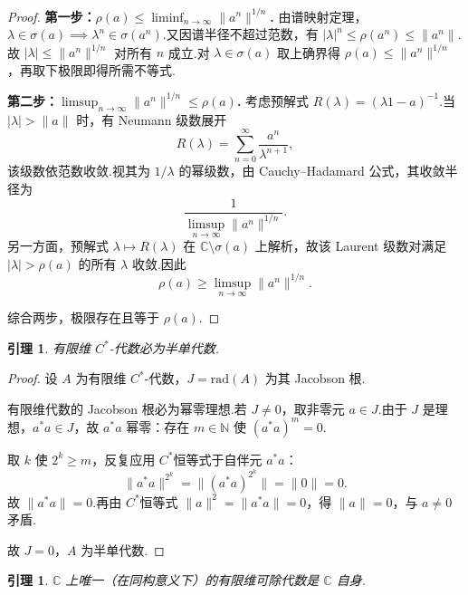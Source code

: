 \documentclass{ctexart}
\newtheorem{lemma}[theorem]{引理}
\theoremstyle{plain}
\newtheorem*{proof}{证明}
\theoremstyle{plain}
\begin{document}
\begin{proof}
    \textbf{第一步：$\rho(a) \le \liminf_{n \to \infty} \|a^n\|^{1/n}$.}
    由谱映射定理，$\lambda \in \sigma(a) \implies \lambda^n \in \sigma(a^n)$.又因谱半径不超过范数，有 $|\lambda|^n \le \rho(a^n) \le \|a^n\|$.故 $|\lambda| \le \|a^n\|^{1/n}$ 对所有 $n$ 成立.对 $\lambda \in \sigma(a)$ 取上确界得 $\rho(a) \le \|a^n\|^{1/n}$，再取下极限即得所需不等式.

    \textbf{第二步：$\limsup_{n \to \infty} \|a^n\|^{1/n} \le \rho(a)$.}
    考虑预解式 $R(\lambda) = (\lambda 1 - a)^{-1}$.当 $|\lambda| > \|a\|$ 时，有 Neumann 级数展开
    \begin{equation*}
        R(\lambda) = \sum_{n=0}^{\infty} \frac{a^n}{\lambda^{n+1}},
    \end{equation*}
    该级数依范数收敛.视其为 $1/\lambda$ 的幂级数，由 Cauchy--Hadamard 公式，其收敛半径为
    \begin{equation*}
        \frac{1}{\limsup_{n \to \infty} \|a^n\|^{1/n}}.
    \end{equation*}
    另一方面，预解式 $\lambda \mapsto R(\lambda)$ 在 $\mathbb{C} \setminus \sigma(a)$ 上解析，故该 Laurent 级数对满足 $|\lambda| > \rho(a)$ 的所有 $\lambda$ 收敛.因此
    \begin{equation*}
        \rho(a) \ge \limsup_{n \to \infty} \|a^n\|^{1/n}.
    \end{equation*}

    综合两步，极限存在且等于 $\rho(a)$.
\end{proof}


\begin{lemma}\label{lem:semisimple}
    有限维 $C^*$-代数必为半单代数.
\end{lemma}
\begin{proof}
    设 $A$ 为有限维 $C^*$-代数，$J = \mathrm{rad}(A)$ 为其 Jacobson 根.\par
    有限维代数的 Jacobson 根必为幂零理想.若 $J \neq 0$，取非零元 $a \in J$.由于 $J$ 是理想，$a^*a \in J$，故 $a^*a$ 幂零：存在 $m \in \mathbb{N}$ 使 $(a^*a)^m = 0$.\par
    取 $k$ 使 $2^k \ge m$，反复应用 $C^*$恒等式于自伴元 $a^*a$：
    \[
        \|a^*a\|^{2^k} = \|(a^*a)^{2^k}\| = \|0\| = 0.
    \]
    故 $\|a^*a\| = 0$.再由 $C^*$恒等式 $\|a\|^2 = \|a^*a\| = 0$，得 $\|a\| = 0$，与 $a \neq 0$ 矛盾.\par
    故 $J = 0$，$A$ 为半单代数.
\end{proof}

\begin{lemma}\label{lem:division}
    $\mathbb{C}$ 上唯一（在同构意义下）的有限维可除代数是 $\mathbb{C}$ 自身.
\end{lemma}
\end{document}
